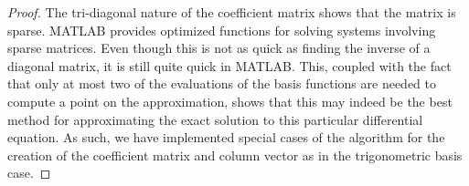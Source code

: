 \begin{proof}
  The tri-diagonal nature of the coefficient matrix shows that the matrix is sparse.
  MATLAB provides optimized functions for solving systems involving sparse matrices.
  Even though this is not as quick as finding the inverse of a diagonal matrix,
  it is still quite quick in MATLAB. This, coupled with the fact that only at most
  two of the evaluations of the basis functions are needed to compute a point
  on the approximation, shows that this may indeed be the best method for approximating
  the exact solution to this particular differential equation. As such, we have implemented
  special cases of the algorithm for the creation of the coefficient matrix and column vector
  as in the trigonometric basis case.

\end{proof}